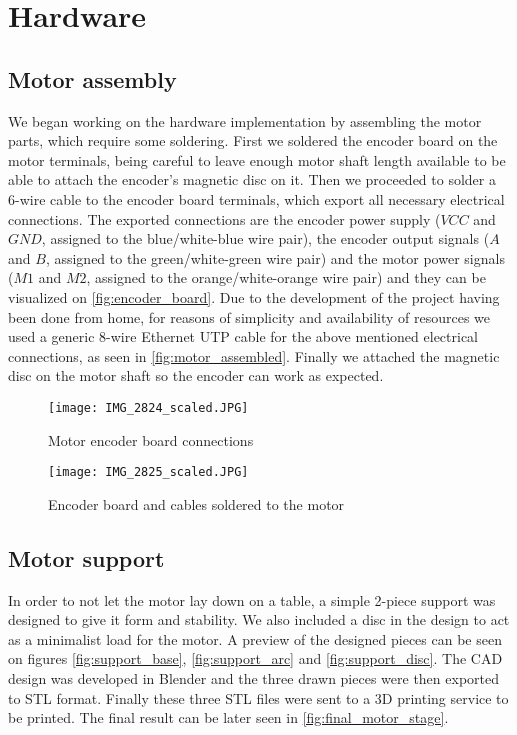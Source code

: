 \section{Hardware} \label{sec:hardware-devel}

\subsection{Motor assembly}
We began working on the hardware implementation by assembling the motor parts, which require some soldering.
First we soldered the encoder board on the motor terminals, being careful to leave enough motor shaft length available to be able to attach the encoder's magnetic disc on it.
Then we proceeded to solder a 6-wire cable to the encoder board terminals, which export all necessary electrical connections.
The exported connections are the encoder power supply ($VCC$ and $GND$, assigned to the blue/white-blue wire pair), the encoder output signals ($A$ and $B$, assigned to the green/white-green wire pair) and the motor power signals ($M1$ and $M2$, assigned to the orange/white-orange wire pair) and they can be visualized on \autoref{fig:encoder_board}.
Due to the development of the project having been done from home, for reasons of simplicity and availability of resources we used a generic 8-wire Ethernet UTP cable for the above mentioned electrical connections, as seen in \autoref{fig:motor_assembled}.
Finally we attached the magnetic disc on the motor shaft so the encoder can work as expected.

\begin{figure}[htp]
	\centering
	\texttt{[image: IMG\_2824\_scaled.JPG]}
	\caption{Motor encoder board connections}
	\label{fig:encoder_board}
\end{figure}

\begin{figure}[htp]
	\centering
	\texttt{[image: IMG\_2825\_scaled.JPG]}
	\caption{Encoder board and cables soldered to the motor}
	\label{fig:motor_assembled}
\end{figure}

\subsection{Motor support}
In order to not let the motor lay down on a table, a simple 2-piece support was designed to give it form and stability.
We also included a disc in the design to act as a minimalist load for the motor.
A preview of the designed pieces can be seen on figures \ref{fig:support_base}, \ref{fig:support_arc} and \ref{fig:support_disc}.
The CAD design was developed in Blender \cite{sw:blender} and the three drawn pieces were then exported to STL format.
Finally these three STL files were sent to a 3D printing service to be printed.
The final result can be later seen in \autoref{fig:final_motor_stage}.

